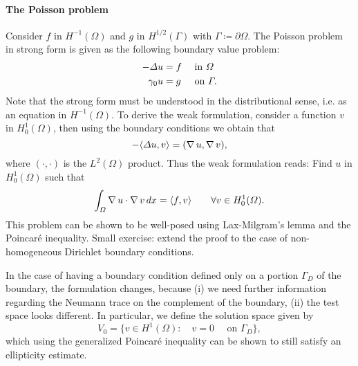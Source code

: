 \paragraph{The Poisson problem} Consider $f$ in $H^{-1}(\Omega)$ and $g$ in $H^{1/2}(\Gamma)$ with $\Gamma\coloneqq \partial\Omega$. The Poisson problem in strong form is given as the following boundary value problem: 
\begin{equation*}
    \begin{aligned}
        -\Delta u  &= f &&\text{ in }\Omega\\
        \gamma_0 u &= g &&\text{ on }\Gamma.
    \end{aligned}
\end{equation*}
Note that the strong form must be understood in the distributional sense, i.e. as an equation in $H^{-1}(\Omega)$. To derive the weak formulation, consider a function $v$ in $H_0^1(\Omega)$, then using the boundary conditions we obtain that 
\begin{equation}
    -\langle \Delta u,v\rangle = (\operatorname{\nabla} u, \operatorname{\nabla} v),
\end{equation}
where $(\cdot, \cdot)$ is the $L^2(\Omega)$ product. Thus the weak formulation reads: Find $u$ in $H_0^1(\Omega)$ such that 
    \begin{equation}
\int_\Omega \operatorname{\nabla} u\cdot \operatorname{\nabla} v\,dx = \langle f, v\rangle \qquad \forall v\in H_0^1(\Omega).
\end{equation}
This problem can be shown to be well-posed using Lax-Milgram's lemma and the Poincaré inequality. Small exercise: extend the proof to the case of non-homogeneous Dirichlet boundary conditions.

In the case of having a boundary condition defined only on a portion $\Gamma_D$ of the boundary, the formulation changes, because (i) we need further information regarding the Neumann trace on the complement of the boundary, (ii) the test space looks different. In particular, we define the solution space given by 
\begin{equation}\label{eq:def-V0}
    V_0 = \{v\in H^1(\Omega): \quad v = 0 \quad\text{ on $\Gamma_D$}\},
\end{equation}
which using the generalized Poincaré inequality can be shown to still satisfy an ellipticity estimate. 

